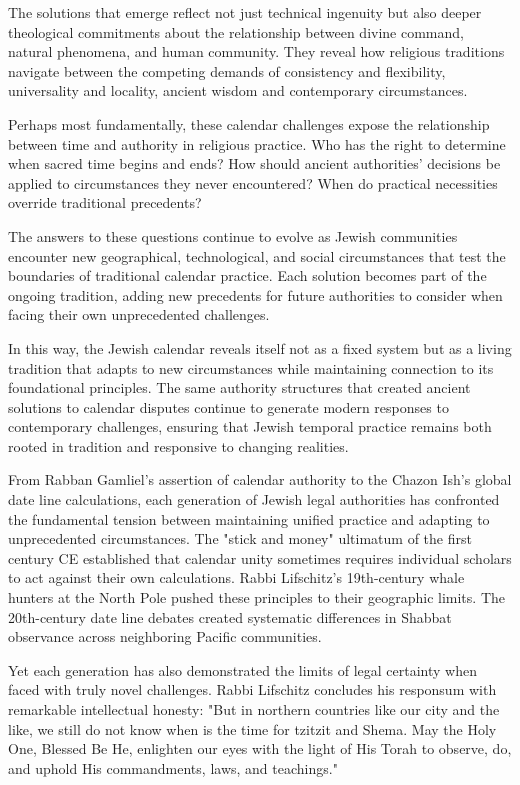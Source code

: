 The solutions that emerge reflect not just technical ingenuity but also deeper theological commitments about the relationship between divine command, natural phenomena, and human community. They reveal how religious traditions navigate between the competing demands of consistency and flexibility, universality and locality, ancient wisdom and contemporary circumstances.

Perhaps most fundamentally, these calendar challenges expose the relationship between time and authority in religious practice. Who has the right to determine when sacred time begins and ends? How should ancient authorities' decisions be applied to circumstances they never encountered? When do practical necessities override traditional precedents?

The answers to these questions continue to evolve as Jewish communities encounter new geographical, technological, and social circumstances that test the boundaries of traditional calendar practice. Each solution becomes part of the ongoing tradition, adding new precedents for future authorities to consider when facing their own unprecedented challenges.

In this way, the Jewish calendar reveals itself not as a fixed system but as a living tradition that adapts to new circumstances while maintaining connection to its foundational principles. The same authority structures that created ancient solutions to calendar disputes continue to generate modern responses to contemporary challenges, ensuring that Jewish temporal practice remains both rooted in tradition and responsive to changing realities.

From Rabban Gamliel's assertion of calendar authority to the Chazon Ish's global date line calculations, each generation of Jewish legal authorities has confronted the fundamental tension between maintaining unified practice and adapting to unprecedented circumstances. The "stick and money" ultimatum of the first century CE established that calendar unity sometimes requires individual scholars to act against their own calculations. Rabbi Lifschitz's 19th-century whale hunters at the North Pole pushed these principles to their geographic limits. The 20th-century date line debates created systematic differences in Shabbat observance across neighboring Pacific communities.

Yet each generation has also demonstrated the limits of legal certainty when faced with truly novel challenges. Rabbi Lifschitz concludes his responsum with remarkable intellectual honesty: "But in northern countries like our city and the like, we still do not know when is the time for tzitzit and Shema. May the Holy One, Blessed Be He, enlighten our eyes with the light of His Torah to observe, do, and uphold His commandments, laws, and teachings."

